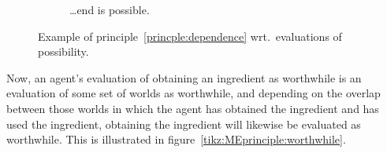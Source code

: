 \documentclass[10pt]{article}
\begin{document}
\begin{figure}[ht]
\begin{subfigure}[h]{0.4\linewidth}
  \caption{\dots end is possible.}
  \label{fig:supermarket:ex}
\end{subfigure}
\hfill\mbox{}
\caption{Example of principle~\ref{princple:dependence} wrt.\ evaluations of possibility.}
\label{tikz:MEprinciple:possibility}
\end{figure}


Now, an agent's evaluation of obtaining an ingredient as worthwhile is an evaluation of some set of worlds as worthwhile, and depending on the overlap between those worlds in which the agent has obtained the ingredient and has used the ingredient, obtaining the ingredient will likewise be evaluated as worthwhile.
This is illustrated in figure~\ref{tikz:MEprinciple:worthwhile}.
\end{document}
